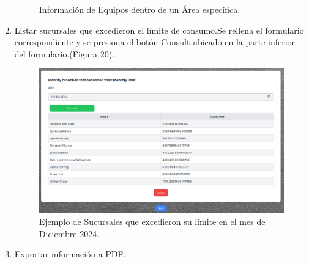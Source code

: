 \documentclass{article}
\begin{document}
\begin{enumerate}
\begin{figure}[h!]
        \caption{Información de Equipos dentro de un Área específica.}
    \end{figure}
    \item Listar sucursales que excedieron el límite de consumo.Se rellena el formulario correspondiente y se presiona el botón Consult ubicado en la parte inferior del formulario.(Figura 20).
    \begin{figure}[h!]
        \centering
        \includegraphics[width= 14cm]{identify_branches.png}
        \caption{Ejemplo de Sucursales que excedieron su límite en el mes de Diciembre 2024.}
    \end{figure}
    \item Exportar información a PDF.
\end{enumerate}
\end{document}
